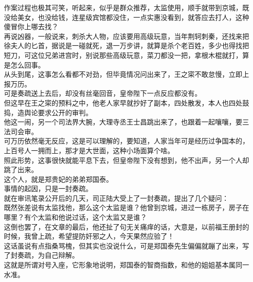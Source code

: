 \begin{multicols}{\theparacolNo}
作案过程也极其可笑，听起来，似乎是群众推荐，太监使用，顺手就带到京城，既没给美女，也没给钱，连星级宾馆都没住，一点实惠没看到，就答应去打人，这种傻冒你上哪去找？\\

再说凶器，一般说来，刺杀大人物，应该要用高级玩意，当年荆轲刺秦，还找来把徐夫人的匕首，据说是一碰就死，退一万步讲，就算是杀个老百姓，多少也得找把短刀，可这位兄弟进宫时，别说那些高级玩意，菜刀都没一把，拿根木棍就打，算是怎么回事。\\

从头到尾，这事怎么看都不对劲，但毕竟情况问出来了，王之寀不敢怠慢，立即上报万历。\\

可是奏疏送上去后，却没有丝毫回音，皇帝陛下一点反应都没有。\\

但这早在王之寀的预料之中，他老人家早就抄好了副本，四处散发，本人也四处鼓捣，造舆论要求公开的审判。\\

他这一闹，另一个司法界大腕，大理寺丞王士昌跳出来了，也跟着一起嚷嚷，要三法司会审。\\

可万历依然毫无反应，这是可以理解的，要知道，人家当年可是经历过争国本的，上百号人一拥而上，那才是大世面，这种小场面算个啥。\\

照此形势，这事很快就能平息下去，但皇帝陛下没有想到，他不出声，另一个人却跳了出来。\\

这个人，就是郑贵妃的弟弟郑国泰。\\

事情的起因，只是一封奏疏。\\

就在审讯笔录公开后的几天，司正陆大受上了一封奏疏，提出了几个疑问：\\

既然张差说有太监找他，那么这个太监是谁？他曾到京城，进过一栋房子，房子在哪里？有个太监和他说过话，这个太监又是谁？\\

这倒也罢了，在文章的最后，他还扯了句无关痛痒的话，大意是，以前福王册封的时候，我曾上疏，希望提防奸邪之人，今天果然应验了！\\

这话虽说有点指桑骂槐，但其实也没说什么，可是郑国泰先生偏偏就蹦了出来，写了封奏疏，为自己辩解。\\

这就是所谓对号入座，它形象地说明，郑国泰的智商指数，和他的姐姐基本属同一水准。\\


\end{multicols}
